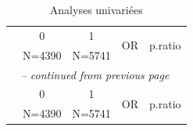 \documentclass{book}
\begin{document}
    \begin{longtable}{lcccc}\caption{Analyses univariées}\\
    \hline  
     &      0       &      1       & \multirow{2}{*}{       OR       } & \multirow{2}{*}{p.ratio}\\ 
 &    N=4390    &    N=5741    &                  &         \\ 
  
    \hline
    \hline     
    \endfirsthead 
    \multicolumn{5}{l}{\tablename\ \thetable{} \textit{-- continued from previous page}}\\ 
    \hline
     &      0       &      1       & \multirow{2}{*}{       OR       } & \multirow{2}{*}{p.ratio}\\ 
 &    N=4390    &    N=5741    &                  &         \\ 


\end{longtable}
\end{document}
